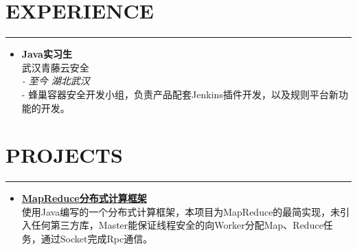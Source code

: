 \documentclass[11 pt, a4paper, usenames, dvipsnames]{article}
\newcommand*{\RoleFont}{%
      \fontsize{14}{8}%
\color{Black}%
\bf
      \selectfont}
\newcommand*{\DateFont}{%
      \fontsize{10}{8}%
\color{Gray}%
\it
      \selectfont}
\newcommand*{\SectionFont}{%
      \fontsize{16}{5}%
\color{CV_Color}%
\bf
\selectfont}
\begin{document}
\setlength{\columnsep}{2.8em}
\vspace{-2pt}
\begin{paracol}{2} 


\section*{\SectionFont\faCubes\enskip  EXPERIENCE}\vspace{-15pt}
\par\noindent\rule{0.22\textwidth}{0.4pt}
\begin{itemize}[leftmargin=0pt,align=left,labelwidth=\parindent,labelsep=0pt]

\item[] {\RoleFont Java实习生 } \\
\normalfont 武汉青藤云安全 \\ 
{\DateFont 2020.7 - 至今 \hfill 湖北武汉 } \\ 
{\color{CV_Color}\LARGE - }{蜂巢容器安全开发小组，负责产品配套Jenkins插件开发，以及规则平台新功能的开发。 }


\end{itemize}


\section*{\SectionFont\faPaperPlane\enskip PROJECTS}\vspace{-15pt}
\par\noindent\rule{0.18\textwidth}{0.4pt}\vspace{-1pt}
\begin{itemize}[leftmargin=0pt,align=left,labelwidth=\parindent,labelsep=0pt]


\item[] \href{https://github.com/CNYuYang/MapReduce}{\textbf{MapReduce分布式计算框架}} \verb||\faGithub\enskip \\ 
使用Java编写的一个分布式计算框架，本项目为MapReduce的最简实现，未引入任何第三方库，Master能保证线程安全的向Worker分配Map、Reduce任务，通过Socket完成Rpc通信。


\end{itemize}
\end{paracol}
\end{document}
